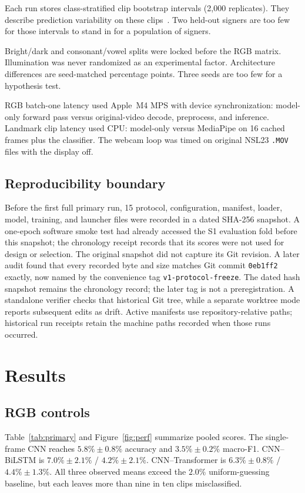 \documentclass[11pt,a4paper]{article}
\begin{document}
Each run stores class-stratified clip bootstrap intervals (2{,}000 replicates). They describe prediction variability on these clips~\cite{efron1993bootstrap}. Two held-out signers are too few for those intervals to stand in for a population of signers.

Bright/dark and consonant/vowel splits were locked before the RGB matrix. Illumination was never randomized as an experimental factor. Architecture differences are seed-matched percentage points. Three seeds are too few for a hypothesis test.

RGB batch-one latency used Apple~M4 MPS with device synchronization: model-only forward pass versus original-video decode, preprocess, and inference. Landmark clip latency used CPU: model-only versus MediaPipe on 16 cached frames plus the classifier. The webcam loop was timed on original NSL23 \texttt{.MOV} files with the display off.

\subsection{Reproducibility boundary}

Before the first full primary run, 15 protocol, configuration, manifest, loader, model, training, and launcher files were recorded in a dated SHA-256 snapshot. A one-epoch software smoke test had already accessed the S1 evaluation fold before this snapshot; the chronology receipt records that its scores were not used for design or selection. The original snapshot did not capture its Git revision. A later audit found that every recorded byte and size matches Git commit \texttt{0eb1ff2} exactly, now named by the convenience tag \texttt{v1-protocol-freeze}. The dated hash snapshot remains the chronology record; the later tag is not a preregistration. A standalone verifier checks that historical Git tree, while a separate worktree mode reports subsequent edits as drift. Active manifests use repository-relative paths; historical run receipts retain the machine paths recorded when those runs occurred.

\section{Results}

\subsection{RGB controls}

Table~\ref{tab:primary} and Figure~\ref{fig:perf} summarize pooled scores. The single-frame CNN reaches $5.8\% \pm 0.8\%$ accuracy and $3.5\% \pm 0.2\%$ macro-F1. CNN--BiLSTM is $7.0\% \pm 2.1\%$ / $4.2\% \pm 2.1\%$. CNN--Transformer is $6.3\% \pm 0.8\%$ / $4.4\% \pm 1.3\%$. All three observed means exceed the $2.0\%$ uniform-guessing baseline, but each leaves more than nine in ten clips misclassified.
\end{document}
